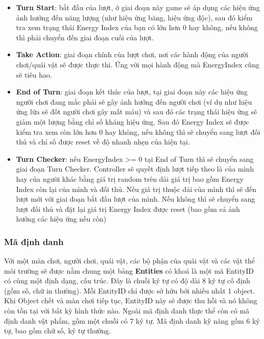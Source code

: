 \begin{itemize}
	\item \textbf{Turn Start}: bắt đầu của lượt, ở giai đoạn này game sẽ áp dụng các hiệu ứng ảnh hưởng đến năng lượng (như hiệu ứng băng, hiệu ứng độc), sau đó kiểm tra xem trạng thái Energy Index của bạn có lớn hơn 0 hay không, nếu không thì phải chuyển đến giai đoạn cuối của lượt.
	\item \textbf{Take Action}: giai đoạn chính của lượt chơi, nơi các hành động của người chơi/quái vật sẽ được thực thi. Ứng với mọi hành động mà EnergyIndex cũng sẽ tiêu hao.
	\item \textbf{End of Turn}: giai đoạn kết thúc của lượt, tại giai đoạn này các hiệu ứng người chơi đang mắc phải sẽ gây ảnh hưởng đến người chơi (ví dụ như hiệu ứng lửa sẽ đốt người chơi gây mất máu) và sau đó các trạng thái hiệu ứng sẽ giảm một lượng bằng chỉ số kháng hiệu ứng. Sau đó Energy Index sẽ được kiểm tra xem còn lớn hơn 0 hay không, nếu không thì sẽ chuyển sang lượt đối thủ và chỉ số được reset về độ nhanh nhẹn của hiện tại.
	\item \textbf{Turn Checker}: nếu EnergyIndex >= 0 tại End of Turn thì sẽ chuyển sang giai đoạn Turn Checker. Controller sẽ quyết định lượt tiếp theo là của mình hay của người khác bằng giá trị random trên dải giá trị bao gồm Energy Index còn lại của mình và đối thủ. Nếu giá trị thuộc dải của mình thì sẽ đến lượt mới với giai đoạn bắt đầu lượt của mình. Nếu không thì sẽ chuyển sang lượt đối thủ và đặt lại giá trị Energy Index được reset (bao gồm cả ảnh hưởng các hiệu ứng nếu còn) 
\end{itemize}
\subsubsection{Mã định danh}
\hspace*{0.5cm} Với một màn chơi, người chơi, quái vật, các bộ phận của quái vật và các vật thể môi trường sẽ được nằm chung một bảng \textbf{Entities} có khoá là một mã EntityID có cùng một định dạng, cấu trúc. Đây là chuỗi ký tự có độ dài 8 ký tự cố định (gồm số, chữ in thường). Mỗi EntityID chỉ được sở hữu bởi nhiều nhất 1 object. Khi Object chết và màn chơi tiếp tục, EntityID này sẽ được thu hồi và nó không còn tồn tại với bất kỳ hình thức nào.
\hspace*{0.5cm} Ngoài mã định danh thực thể còn có mã định danh vật phẩm, gồm một chuỗi có 7 ký tự. Mã định danh kỹ năng gồm 6 ký tự, bao gồm chữ số, ký tự thường.
